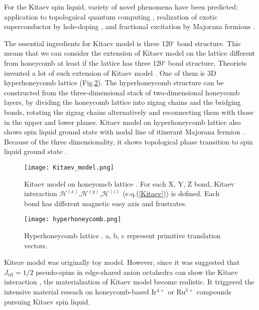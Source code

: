 \documentclass[a4,10.5pt]{report}
\begin{document}
For the Kitaev spin liquid, variety of novel phenomena have been predicted: application to topologaical quantum computing \cite{kitaev2006anyons}, 
realization of exotic superconductor by hole-doping \cite{you2012doping}, and fractional excitation by Majorana fermions \cite{nasu2015thermal, yoshitake2017temperature}.

The essential ingredients for Kitaev model is three 120$^\circ$ bond structure.
This means that we can consider the extension of Kitaev model on the lattice different from honeycomb at least if the lattice has three 120$^\circ$ bond structure. 
Theorists invented a lot of such extension of Kitaev model \cite{o2016classification}.
One of them is 3D hyperhoneycomb lattice (Fig.\ref{hyperhoneycomb}).
The hyperhoneycomb structure can be constructed from the three-dimensional stack of two-dimensional honeycomb layers, 
by dividing the honeycomb lattice into zigzag chains and the bridging bonds, rotating the zigzag chains alternatively and reconnecting them with those in the upper and lower planes.
Kitaev model on hyperhoneycomb lattice also shows spin liquid ground state with nodal line of itinerant Majorana fermion \cite{mandal2009exactly}.
Because of the three dimensionality, it shows topological phase transition to spin liquid ground state \cite{nasu2014vaporization}.

\begin{figure}
  \centering
  \texttt{[image: Kitaev\_model.png]}
  \caption{Kitaev model on honeyomcb lattice \cite{kitaev2006anyons, kitagawa2018spin}.
  For each X, Y, Z bond, Kitaev interaction $\mathcal{H}^{(x)}$,$\mathcal{H}^{(y)}$,$\mathcal{H}^{(z)}$ (e.q.(\ref{Kitaev})) is defined.
  Each bond has different magnetic easy axis and frustrates.}
  \label{Kitaev_model}
\end{figure}

\begin{figure}
  \centering
  \texttt{[image: hyperhoneycomb.png]}
  \caption{Hyperhoneycomb lattice \cite{nasu2014vaporization}. a, b, c represent primitive translation vectors.}
  \label{hyperhoneycomb}
\end{figure}

Kiteav model was originally toy model.
However, since it was suggested that $J_{\mathrm{eff}} = 1/2$ pseudo-spins in edge-shared anion octahedra can show the Kitaev interaction \cite{jackeli2009mott}, 
the materialzation of Kitaev model become realistic.
It triggered the intensive material reseach on honeycomb-based Ir$^{4+}$ or Ru$^{3+}$ compounds pursuing Kitaev spin liquid.
\end{document}
